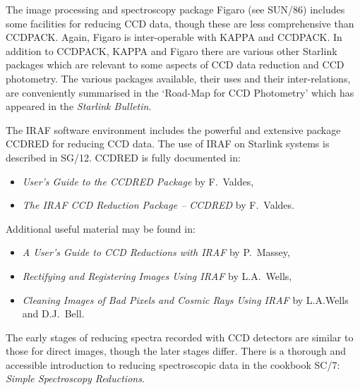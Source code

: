 \documentclass[twoside,11pt]{article}
\newcommand{\xref}[3]{#1}
\begin{document}
The image processing and spectroscopy package Figaro (see
\xref{SUN/86}{sun86}{}\/\cite{SUN86}) includes some facilities for
reducing CCD data, though these are less comprehensive than CCDPACK.
Again, Figaro is inter-operable with KAPPA and CCDPACK.  In addition to
CCDPACK, KAPPA and Figaro there are various other Starlink packages which
are relevant to some aspects of CCD data reduction and CCD photometry.
The various packages available, their uses and their inter-relations,
are conveniently summarised in the `Road-Map for CCD
Photometry'\cite{DAVENHALL98} which has appeared in the {\it Starlink
Bulletin}.

The IRAF software environment includes the powerful and extensive package
CCDRED for reducing CCD data.  The use of IRAF on Starlink systems is
described in \xref{SG/12}{sg12}{}\/\cite{SG12}.  CCDRED is fully
documented in:

\begin{itemize}

  \item {\it User's Guide to the CCDRED Package}\/ by
   F.~Valdes\cite{VALDES90_1},

  \item {\it The IRAF CCD Reduction Package -- CCDRED}\/ by
   F.~Valdes\cite{VALDES90_2}.

\end{itemize}

Additional useful material may be found in:

\begin{itemize}

  \item {\it A User's Guide to CCD Reductions with IRAF}\/ by
   P.~Massey\cite{MASSEY97},

  \item {\it Rectifying and Registering Images Using IRAF}\/ by
   L.A.~Wells\cite{WELLS94_1},

  \item {\it Cleaning Images of Bad Pixels and Cosmic Rays Using IRAF}\/
   by L.A.Wells and D.J.~Bell\cite{WELLS94_2}.

\end{itemize}

The early stages of reducing spectra recorded with CCD detectors are
similar to those for direct images, though the later stages differ.  There
is a thorough and accessible introduction to reducing spectroscopic data
in the cookbook \xref{SC/7}{sc7}{}: {\it Simple Spectroscopy
Reductions}\/\cite{SC7}.
\end{document}

